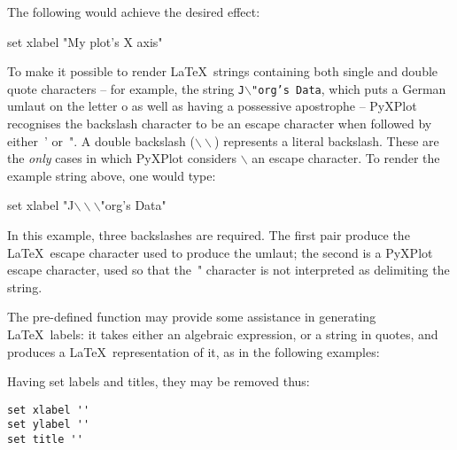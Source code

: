 \noindent The following would achieve the desired effect:

\begin{dodo}
set xlabel "My plot's X axis"
\end{dodo}

To make it possible to render \LaTeX\ strings containing both single and double
quote characters -- for example, the string {\tt J$\backslash$"org's Data},
which puts a German umlaut on the letter o as well as having a possessive
apostrophe -- PyXPlot recognises the backslash character to be an escape
character when followed by either~' or~". A double backslash
($\backslash\backslash$) represents a literal backslash. These are the
\textit{only} cases in which PyXPlot considers $\backslash$ an escape
character. To render the example string above, one would type:

\begin{dodo}
set xlabel "J$\backslash\backslash\backslash$"org's Data"
\end{dodo}

\noindent In this example, three backslashes are required. The first pair
produce the \LaTeX\ escape character used to produce the umlaut; the second is
a PyXPlot escape character, used so that the~" character is not interpreted as
delimiting the string. 

The pre-defined  function may provide some assistance in
generating \LaTeX\ labels: it takes either an algebraic expression, or a string
in quotes, and produces a \LaTeX\ representation of it, as in the following
examples:

\vspace{3mm}
\newline
{}\newline
{}\newline
{}\newline
{}
\vspace{3mm}

Having set labels and titles, they may be removed thus:

\begin{verbatim}
set xlabel ''
set ylabel ''
set title ''
\end{verbatim}

